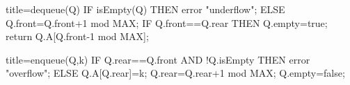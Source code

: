 \documentclass[
    ngerman,
    color=3b,
    load_common, %
    summary,
    boxarc,
]{tuda_summary}
\begin{document}
\begin{minipage}[t]{.49\textwidth}\mbox{}
    \begin{codeBlock}[autogobble]{title={dequeue(Q)}}
        IF isEmpty(Q) THEN
            error "underflow";
        ELSE
            Q.front=Q.front+1 mod MAX;
            IF Q.front==Q.rear THEN
                Q.empty=true;
            return Q.A[Q.front-1 mod MAX];
    \end{codeBlock}
\end{minipage}
\begin{minipage}[t]{.5\textwidth}\mbox{}
    \begin{codeBlock}[autogobble]{title={enqueue(Q,k)}}
        IF Q.rear==Q.front AND !Q.isEmpty
        THEN error "overflow";
        ELSE
            Q.A[Q.rear]=k;
            Q.rear=Q.rear+1 mod MAX;
            Q.empty=false;
    \end{codeBlock}
\end{minipage}

\clearpage
\end{document}

